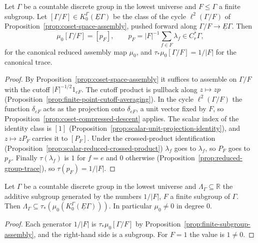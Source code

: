 \begin{proposition}\label{prop:finite-subgroup-assembly}
\leanok
Let $\Gamma$ be a countable discrete group in the lowest universe and
$F\le\Gamma$ a finite subgroup. Let $[\Gamma/F]\in K^\Gamma_0(\underline E\Gamma)$ be
the class of the cycle $\ell^2(\Gamma/F)$ of
Proposition~\ref{prop:coset-space-assembly}, pushed forward along
$\Gamma/F\to\underline E\Gamma$. Then
\[
  \mu_0[\Gamma/F]=[p_F],\qquad p_F=|F|^{-1}\sum_{f\in F}\lambda_f\in C^*_r\Gamma,
\]
for the canonical reduced assembly map $\mu_0$, and $\tau_*\mu_0[\Gamma/F]=1/|F|$ for
the canonical trace.
\end{proposition}
\begin{proof}
\leanok
By Proposition~\ref{prop:coset-space-assembly} it suffices to assemble on
$\Gamma/F$ with the cutoff $|F|^{-1/2}1_{eF}$. The cutoff product is pullback along
$z\mapsto zp$ (Proposition~\ref{prop:finite-point-cutoff-averaging}). In the cycle
$\ell^2(\Gamma/F)$ the function $\delta_{eF}$ acts as the projection onto
$\delta_{eF}$, a unit vector fixed by $F$, so
Proposition~\ref{prop:coset-compressed-descent} applies. The scalar index of the
identity class is $[1]$
(Proposition~\ref{prop:scalar-unit-projection-identity}), and $z\mapsto zP_F$ carries
it to $[P_F]$. Under the crossed-product identification
(Proposition~\ref{prop:scalar-reduced-crossed-product}) $\lambda_f$ goes to
$\lambda_f$, so $P_F$ goes to $p_F$. Finally $\tau(\lambda_f)$ is $1$ for $f=e$ and
$0$ otherwise (Proposition~\ref{prop:reduced-group-trace}), so $\tau(p_F)=1/|F|$.
\end{proof}

\begin{proposition}\label{prop:finite-subgroup-trace-range}
\leanok
Let $\Gamma$ be a countable discrete group in the lowest universe and
$\Lambda_\Gamma\subseteq\mathbb R$ the additive subgroup generated by the numbers
$1/|F|$, $F$ a finite subgroup of $\Gamma$. Then
$\Lambda_\Gamma\subseteq\tau_*(\mu_0(K^\Gamma_0(\underline E\Gamma)))$. In particular
$\mu_0\neq0$ in degree $0$.
\end{proposition}
\begin{proof}
\leanok
Each generator $1/|F|$ is $\tau_*\mu_0[\Gamma/F]$ by
Proposition~\ref{prop:finite-subgroup-assembly}, and the right-hand side is a
subgroup. For $F=1$ the value is $1\neq0$.
\end{proof}

